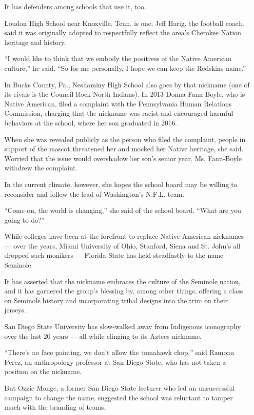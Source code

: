 It has defenders among schools that use it, too.

Loudon High School near Knoxville, Tenn, is one. Jeff Harig, the
football coach, said it was originally adopted to respectfully reflect
the area's Cherokee Nation heritage and history.

``I would like to think that we embody the positives of the Native
American culture,'' he said. ``So for me personally, I hope we can keep
the Redskins name.''

In Bucks County, Pa., Neshaminy High School also goes by that nickname
(one of its rivals is the Council Rock North Indians). In 2013 Donna
Fann-Boyle, who is Native American, filed a complaint with the
Pennsylvania Human Relations Commission, charging that the nickname was
racist and encouraged harmful behaviors at the school, where her son
graduated in 2016.

When she was revealed publicly as the person who filed the complaint,
people in support of the mascot threatened her and mocked her Native
heritage, she said. Worried that the issue would overshadow her son's
senior year, Ms. Fann-Boyle withdrew the complaint.

In the current climate, however, she hopes the school board may be
willing to reconsider and follow the lead of Washington's N.F.L. team.

``Come on, the world is changing,'' she said of the school board. ``What
are you going to do?''

While colleges have been at the forefront to replace Native American
nicknames --- over the years, Miami University of Ohio, Stanford, Siena
and St. John's all dropped such monikers --- Florida State has held
steadfastly to the name Seminole.

It has asserted that the nickname embraces the culture of the Seminole
nation, and it has garnered the group's blessing by, among other things,
offering a class on Seminole history and incorporating tribal designs
into the trim on their jerseys.

San Diego State University has slow-walked away from Indigenous
iconography over the last 20 years --- all while clinging to its Aztecs
nickname.

``There's no face painting, we don't allow the tomahawk chop,'' said
Ramona Perez, an anthropology professor at San Diego State, who has not
taken a position on the nickname.

But Ozzie Monge, a former San Diego State lecturer who led an
unsuccessful campaign to change the name, suggested the school was
reluctant to tamper much with the branding of teams.

